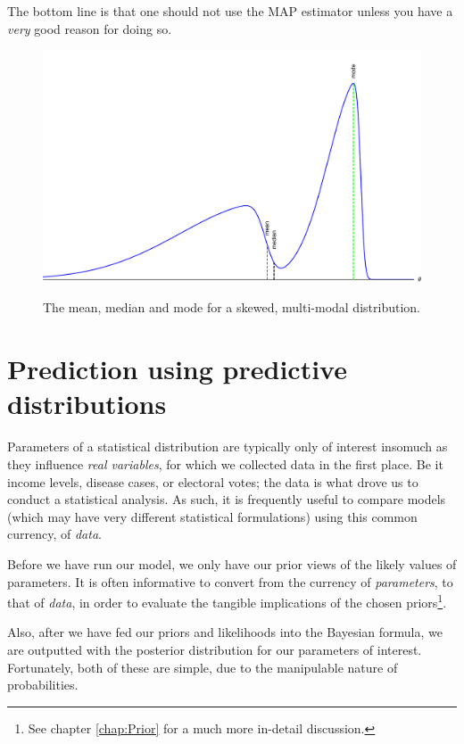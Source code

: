 \documentclass[11pt,fullpage]{book}
\begin{document}
The bottom line is that one should not use the MAP estimator unless you have a \textit{very} good reason for doing so. 

\begin{figure}
\centering
\scalebox{0.4} 
{\includegraphics{Posterior_meanMedianMAP.pdf}}
\caption{The mean, median and mode for a skewed, multi-modal distribution.}\label{fig:Posterior_meanMedianMAP}
\end{figure}


\section{Prediction using predictive distributions}
Parameters of a statistical distribution are typically only of interest insomuch as they influence \textit{real variables}, for which we collected data in the first place. Be it income levels, disease cases, or electoral votes; the data is what drove us to conduct a statistical analysis. As such, it is frequently useful to compare models (which may have very different statistical formulations) using this common currency, of \textit{data}.

Before we have run our model, we only have our prior views of the likely values of parameters. It is often informative to convert from the currency of \textit{parameters}, to that of \textit{data}, in order to evaluate the tangible implications of the chosen priors\footnote{See chapter \ref{chap:Prior} for a much more in-detail discussion.}.

Also, after we have fed our priors and likelihoods into the Bayesian formula, we are outputted with the posterior distribution for our parameters of interest. Fortunately, both of these are simple, due to the manipulable nature of probabilities.
\end{document}
